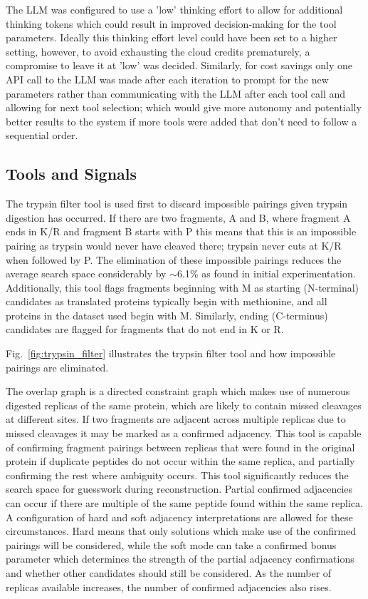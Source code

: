 \documentclass[journal]{IEEEtran}
\begin{document}
The LLM was configured to use a 'low' thinking effort to allow for additional thinking tokens which could
result in improved decision-making for the tool parameters. Ideally this thinking effort level could have been set
to a higher setting, however, to avoid exhausting the cloud credits prematurely, a compromise to leave it at 'low' was decided.
Similarly, for cost savings only one API call to the LLM was made after each iteration to prompt for the new parameters
rather than communicating with the LLM after each tool call and allowing for next tool selection; which would give more autonomy
and potentially better results to the system if more tools were added that don't need to follow a sequential order.



\subsection{Tools and Signals}
The trypsin filter tool is used first to discard impossible pairings given trypsin digestion has
occurred. If there are two fragments, A and B, where fragment A ends in K/R and fragment B starts with P
this means that this is an impossible pairing as trypsin would never have cleaved there; trypsin never cuts
at K/R when followed by P. The elimination of these impossible pairings reduces
the average search space considerably by $\sim$6.1\% as found in initial experimentation.
Additionally, this tool flags fragments beginning with M as starting (N-terminal) candidates as translated proteins
typically begin with methionine, and all proteins in the dataset used begin with M. Similarly, ending (C-terminus) candidates
are flagged for fragments that do not end in K or R.


Fig.~\ref{fig:trypsin_filter} illustrates the trypsin filter tool and how impossible pairings are eliminated.



The overlap graph is a directed constraint graph which makes use of numerous digested replicas of the same protein, which are likely to contain missed
cleavages at different sites. If two fragments are adjacent across multiple replicas due to missed cleavages
it may be marked as a confirmed adjacency. This tool is capable of confirming fragment pairings between replicas that were found in the original protein 
if duplicate peptides do not occur within the same replica, and partially confirming the rest where ambiguity occurs.
This tool significantly reduces the search space for guesswork during reconstruction. Partial confirmed adjacencies
can occur if there are multiple of the same peptide found within the same replica. A configuration of hard and soft 
adjacency interpretations are allowed for these circumstances. Hard means that only solutions which make use
of the confirmed pairings will be considered, while the soft mode can take a confirmed bonus parameter which determines the strength
of the partial adjacency confirmations and whether other candidates should still be considered. As the number of replicas available
increases, the number of confirmed adjacencies also rises.
\end{document}
